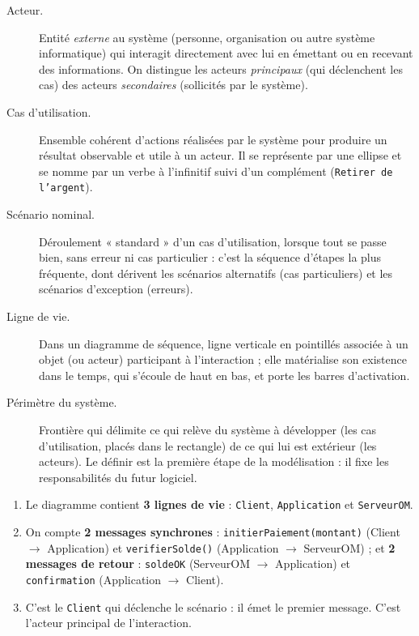 \documentclass[11pt]{article}
\begin{document}
\begin{corrige}
\begin{description}
\item[Acteur.] Entité \emph{externe} au système (personne, organisation ou autre système informatique) qui interagit directement avec lui en émettant ou en recevant des informations. On distingue les acteurs \emph{principaux} (qui déclenchent les cas) des acteurs \emph{secondaires} (sollicités par le système).
\item[Cas d'utilisation.] Ensemble cohérent d'actions réalisées par le système pour produire un résultat observable et utile à un acteur. Il se représente par une ellipse et se nomme par un verbe à l'infinitif suivi d'un complément (\texttt{Retirer de l'argent}).
\item[Scénario nominal.] Déroulement « standard » d'un cas d'utilisation, lorsque tout se passe bien, sans erreur ni cas particulier : c'est la séquence d'étapes la plus fréquente, dont dérivent les scénarios alternatifs (cas particuliers) et les scénarios d'exception (erreurs).
\item[Ligne de vie.] Dans un diagramme de séquence, ligne verticale en pointillés associée à un objet (ou acteur) participant à l'interaction ; elle matérialise son existence dans le temps, qui s'écoule de haut en bas, et porte les barres d'activation.
\item[Périmètre du système.] Frontière qui délimite ce qui relève du système à développer (les cas d'utilisation, placés dans le rectangle) de ce qui lui est extérieur (les acteurs). Le définir est la première étape de la modélisation : il fixe les responsabilités du futur logiciel.
\end{description}
\end{corrige}

\begin{corrige}
\begin{enumerate}
\item Le diagramme contient \textbf{3 lignes de vie} : \texttt{Client}, \texttt{Application} et \texttt{ServeurOM}.
\item On compte \textbf{2 messages synchrones} : \texttt{initierPaiement(montant)} (Client $\to$ Application) et \texttt{verifierSolde()} (Application $\to$ ServeurOM) ; et \textbf{2 messages de retour} : \texttt{soldeOK} (ServeurOM $\to$ Application) et \texttt{confirmation} (Application $\to$ Client).
\item C'est le \texttt{Client} qui déclenche le scénario : il émet le premier message. C'est l'acteur principal de l'interaction.
\end{enumerate}
\end{corrige}
\end{document}
